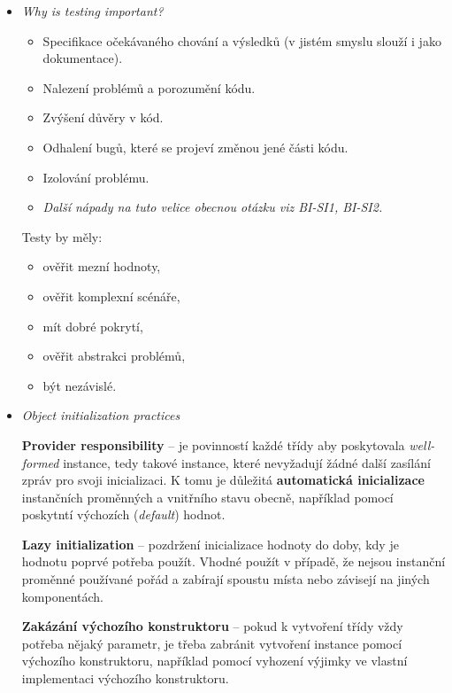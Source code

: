 \documentclass{szzclass}
\begin{document}
\begin{itemize}
      \item \textit{Why is testing important?}
      
      \begin{itemize}
            \item Specifikace očekávaného chování a výsledků (v jistém smyslu slouží i jako dokumentace).
            \item Nalezení problémů a porozumění kódu.
            \item Zvýšení důvěry v kód.
            \item Odhalení bugů, které se projeví změnou jené části kódu.
            \item Izolování problému.
            \item \textit{Další nápady na tuto velice obecnou otázku viz BI-SI1, BI-SI2.}
      \end{itemize}

      Testy by měly:

      \begin{itemize}
            \item ověřit mezní hodnoty,
            \item ověřit komplexní scénáře,
            \item mít dobré pokrytí,
            \item ověřit abstrakci problémů,
            \item být nezávislé.
      \end{itemize}

      \item \textit{Object initialization practices}
      
      \textbf{Provider responsibility} -- je povinností každé třídy aby poskytovala \textit{well-formed} instance,
      tedy takové instance, které nevyžadují žádné další zasílání zpráv pro svoji inicializaci.
      K tomu je důležitá \textbf{automatická inicializace} instančních proměnných a vnitřního stavu obecně,
      například pomocí poskytntí výchozích (\textit{default}) hodnot.

      \textbf{Lazy initialization} -- pozdržení inicializace hodnoty do doby, kdy je hodnotu poprvé potřeba použít.
      Vhodné použít v případě, že nejsou instanční proměnné používané 
      pořád a zabírají spoustu místa nebo závisejí na jiných komponentách.

      \textbf{Zakázání výchozího konstruktoru} -- pokud k vytvoření třídy vždy potřeba nějaký parametr,
      je třeba zabránit vytvoření instance pomocí výchozího konstruktoru, například pomocí vyhození výjimky
      ve vlastní implementaci výchozího konstruktoru.


\end{itemize}
\end{document}
